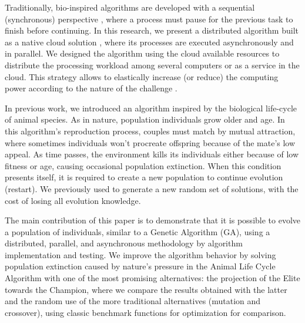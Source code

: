 \documentclass[graybox]{svmult}
\begin{document}
    Traditionally, bio-inspired algorithms are developed with a sequential
    (synchronous) perspective
    \cite{porto2018evolutionary,back1996evolutionary}, where a process must
    pause for the previous task to finish before continuing.
    In this research,
    we present a distributed algorithm built as a native cloud solution %
    , where its processes are executed asynchronously and in
    parallel. We designed the algorithm using the cloud available resources to
    distribute the processing workload among several computers or as a service
    in the cloud. 
    This strategy allows to elastically increase (or reduce) the
    computing power according to the nature of the challenge
    \cite{armbrust2010view}.

    In previous work, we introduced an algorithm inspired by the biological %
    life-cycle of animal species. As in nature, population individuals grow older
    and age. In this algorithm's reproduction process, couples must match by mutual
    attraction, where sometimes individuals won't procreate offspring because of
    the mate's low appeal. As time passes, the environment kills its individuals
    either because of low fitness or age, causing occasional population extinction.
    When this condition presents itself, it is required to create a new population
    to continue evolution (restart). 
    We previously used to generate a new random %
    set of solutions, with the cost of losing all evolution knowledge.

    The main contribution of this paper is to demonstrate that it is possible to
    evolve a population of individuals, similar to a Genetic Algorithm (GA), using
    a distributed, parallel, and asynchronous methodology by algorithm
    implementation and testing.
    We improve the algorithm behavior by solving
    population extinction caused by nature's pressure in the Animal Life Cycle %
    Algorithm with one of the most promising alternatives: the projection of the
    Elite towards the Champion, where we compare the results obtained with the
    latter and the random use of the more traditional alternatives (mutation and
    crossover), using classic benchmark functions for optimization for comparison.
\end{document}
